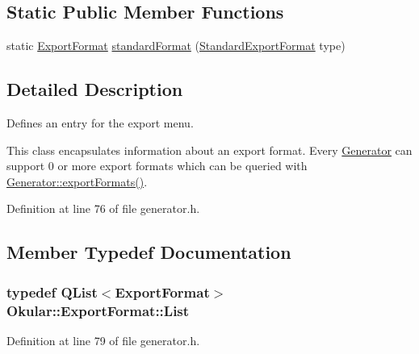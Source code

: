 \subsection*{Static Public Member Functions}
\begin{DoxyCompactItemize}
\item 
static \hyperlink{classOkular_1_1ExportFormat}{Export\+Format} \hyperlink{classOkular_1_1ExportFormat_a5a403d349fe023513836471a18f55ced}{standard\+Format} (\hyperlink{classOkular_1_1ExportFormat_af030ecc6c77b5cdd89cd1bc4a894c6f2}{Standard\+Export\+Format} type)
\end{DoxyCompactItemize}


\subsection{Detailed Description}
Defines an entry for the export menu. 

This class encapsulates information about an export format. Every \hyperlink{classOkular_1_1Generator}{Generator} can support 0 or more export formats which can be queried with \hyperlink{classOkular_1_1Generator_a74280fb193319daab955feac694123ac}{Generator\+::export\+Formats()}. 

Definition at line 76 of file generator.\+h.



\subsection{Member Typedef Documentation}
\hypertarget{classOkular_1_1ExportFormat_a987d72c1a1456b8a983a37603a8fa78d}{
\subsubsection[{List}]{\setlength{\rightskip}{0pt plus 5cm}typedef {\bf Q\+List}$<${\bf Export\+Format}$>$ {\bf Okular\+::\+Export\+Format\+::\+List}}}\label{classOkular_1_1ExportFormat_a987d72c1a1456b8a983a37603a8fa78d}


Definition at line 79 of file generator.\+h.



